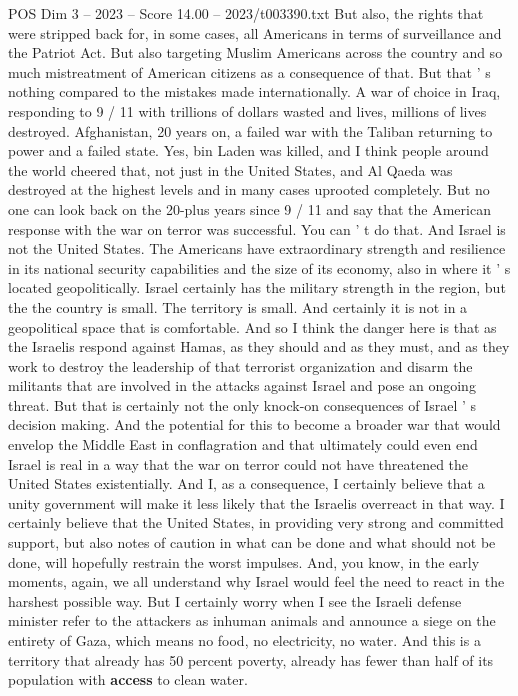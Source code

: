 \begin{textsample}{POS Dim 3 – 2023 – Score 14.00 – 2023/t003390.txt}
But also, the rights that were stripped back for, in some cases, all Americans in terms of surveillance and the Patriot Act.
But also targeting Muslim Americans across the country and so much mistreatment of American citizens as a consequence of that.
But that ' s nothing compared to the mistakes made internationally.
A war of choice in Iraq, responding to 9 / 11 with trillions of dollars wasted and lives, millions of lives destroyed.
Afghanistan, 20 years on, a failed war with the Taliban returning to power and a failed state.
Yes, bin Laden was killed, and I think people around the world cheered that, not just in the United States, and Al Qaeda was destroyed at the highest levels and in many cases uprooted completely.
But no one can look back on the 20-plus years since 9 / 11 and say that the American response with the war on terror was successful.
You can ' t do that.
And Israel is not the United States.
The Americans have extraordinary strength and resilience in its national security capabilities and the size of its economy, also in where it ' s located geopolitically.
Israel certainly has the military strength in the region, but the the country is small.
The territory is small.
And certainly it is not in a geopolitical space that is comfortable.
And so I think the danger here is that as the Israelis respond against Hamas, as they should and as they must, and as they work to destroy the leadership of that terrorist organization and disarm the militants that are involved in the attacks against Israel and pose an ongoing threat.
But that is certainly not the only knock-on consequences of Israel ' s decision making.
And the potential for this to become a broader war that would envelop the Middle East in conflagration and that ultimately could even end Israel is real in a way that the war on terror could not have threatened the United States existentially.
And I, as a consequence, I certainly believe that a unity government will make it less likely that the Israelis overreact in that way.
I certainly believe that the United States, in providing very strong and committed support, but also notes of caution in what can be done and what should not be done, will hopefully restrain the worst impulses.
And, you know, in the early moments, again, we all understand why Israel would feel the need to react in the harshest possible way.
But I certainly worry when I see the Israeli defense minister refer to the attackers as inhuman animals and announce a siege on the entirety of Gaza, which means no food, no electricity, no water.
And this is a territory that already has 50 percent poverty, already has fewer than half of its population with \textbf{access} to clean water.

\end{textsample}
